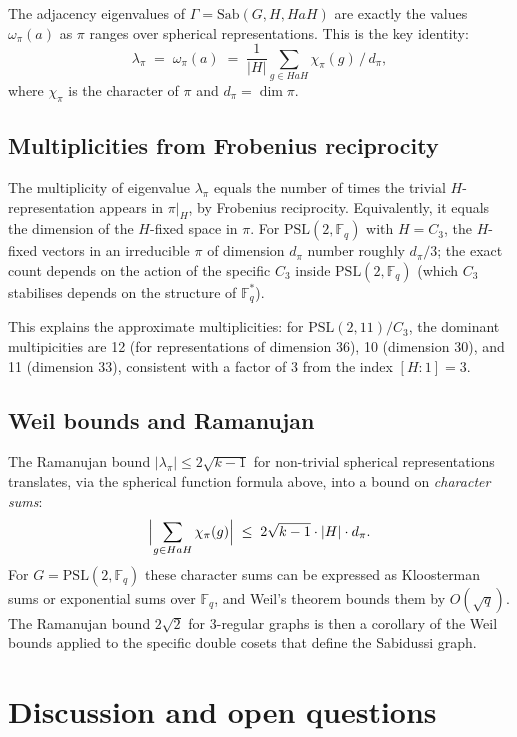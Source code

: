 \documentclass[11pt,a4paper]{amsart}
\theoremstyle{definition}
\theoremstyle{remark}
\newcommand{\PSL}[1]{\mathrm{PSL}(2,\mathbb{F}_{#1})}
\newcommand{\Sab}{\mathrm{Sab}}
\newcommand{\F}{\mathbb{F}}
\begin{document}
The adjacency eigenvalues of $\Gamma = \Sab(G,H,HaH)$ are exactly the values
$\omega_\pi(a)$ as $\pi$ ranges over spherical representations.  This is the
key identity:
\[
  \boxed{\lambda_\pi \;=\; \omega_\pi(a) \;=\;
    \frac{1}{|H|} \sum_{g \in HaH} \chi_\pi(g)\,/\,d_\pi,}
\]
where $\chi_\pi$ is the character of $\pi$ and $d_\pi = \dim\pi$.

\subsection{Multiplicities from Frobenius reciprocity}

The multiplicity of eigenvalue $\lambda_\pi$ equals the number of times the
trivial $H$-representation appears in $\pi|_H$, by Frobenius reciprocity.
Equivalently, it equals the dimension of the $H$-fixed space in $\pi$.  For
$\PSL{q}$ with $H = C_3$, the $H$-fixed vectors in an irreducible $\pi$ of
dimension $d_\pi$ number roughly $d_\pi/3$; the exact count depends on the
action of the specific $C_3$ inside $\PSL{q}$ (which $C_3$ stabilises depends
on the structure of $\F_q^*$).

This explains the approximate multiplicities: for $\mathrm{PSL}(2,11)/C_3$,
the dominant multipicities are 12 (for representations of dimension 36),
10 (dimension 30), and 11 (dimension 33), consistent with a factor of 3 from
the index $[H:1]=3$.

\subsection{Weil bounds and Ramanujan}

The Ramanujan bound $|\lambda_\pi| \leq 2\sqrt{k-1}$ for non-trivial spherical
representations translates, via the spherical function formula above, into a
bound on \emph{character sums}:
\[
  \Bigl|\sum_{g \in HaH} \chi_\pi(g)\Bigr| \;\leq\; 2\sqrt{k-1}\cdot |H| \cdot d_\pi.
\]
For $G = \PSL{q}$ these character sums can be expressed as Kloosterman sums
or exponential sums over $\F_q$, and Weil's theorem \cite{Weil1948} bounds
them by $O(\sqrt{q})$.  The Ramanujan bound $2\sqrt{2}$ for 3-regular graphs
is then a corollary of the Weil bounds applied to the specific double cosets
that define the Sabidussi graph.

\section{Discussion and open questions}
\end{document}
